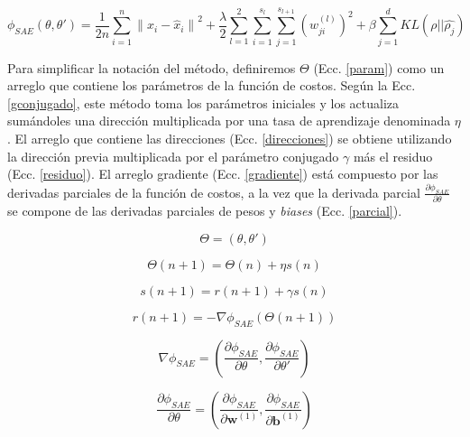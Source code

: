 \documentclass[12pt]{article}
\begin{document}
\begin{equation}
\label{scost}
\phi_{SAE}(\theta,\theta')=\frac{1}{2n}\sum_{i=1}^{n}{\|x_{i}-\hat{x}_{i}\|}^2 + \frac{\lambda}{2}\sum_{l=1}^{2}\sum_{i=1}^{s_l}\sum_{j=1}^{s_{l+1}}({w^{(l)}_{ji}})^2 + \beta\sum_{j=1}^{d}KL(\rho||\hat{\rho_{j}})
\end{equation} 

Para simplificar la notación del método, definiremos $\Theta$ (Ecc. \ref{param}) como un arreglo que contiene los parámetros de la función de costos. Según la Ecc. \ref{gconjugado}, este método toma los parámetros iniciales y los actualiza sumándoles una dirección multiplicada por una tasa de aprendizaje denominada $\eta$. El arreglo que contiene las direcciones (Ecc. \ref{direcciones}) se obtiene utilizando la dirección previa multiplicada por el parámetro conjugado $\gamma$ más el residuo (Ecc. \ref{residuo}). El arreglo gradiente (Ecc. \ref{gradiente}) está compuesto por las derivadas parciales de la función de costos, a la vez que la derivada parcial $\frac{\partial{\phi_{SAE}}}{\partial{\theta}}$ se compone de las derivadas parciales de pesos y \textit{biases} (Ecc. \ref{parcial}).

\begin{equation}
\label{param}
\Theta = (\theta,\theta')
\end{equation} 

\begin{equation}
\label{gconjugado}
\Theta(n+1)=\Theta(n)+{\eta}s(n)
\end{equation}

\begin{equation}
\label{direcciones}
s(n+1)=r(n+1)+\gamma{s(n)}
\end{equation} 

\begin{equation}
\label{residuo}
r(n+1) = -\nabla{\phi_{SAE}(\Theta(n+1))}
\end{equation} 

\begin{equation}
\label{gradiente}
\nabla{\phi_{SAE}} = \left(\frac{\partial{\phi_{SAE}}}{\partial{\theta}},\frac{\partial{\phi_{SAE}}}{\partial{\theta'}}\right)
\end{equation}

\begin{equation}
\label{parcial}
\frac{\partial{\phi_{SAE}}}{\partial{\theta}} = \left(\frac{\partial{\phi_{SAE}}}{\partial{\textbf{w}^{(1)}}},\frac{\partial{\phi_{SAE}}}{\partial{\textbf{b}^{(1)}}}\right)
\end{equation}  
\end{document}

